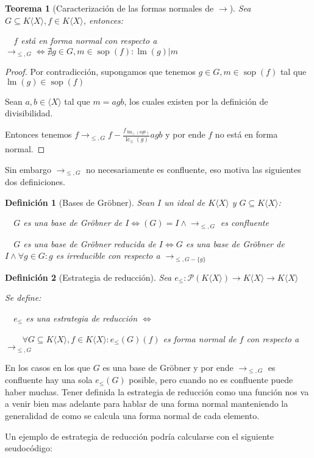 \documentclass{amsbook}
\theoremstyle{customstyle}
\newtheorem{definition}{Definición}[section]
\newtheorem{theorem}{Teorema}[section]
\DeclareMathOperator{\sop}{sop}
\DeclareMathOperator{\lm}{lm}
\DeclareMathOperator{\lc}{lc}
\begin{document}
\begin{theorem}[Caracterización de las formas normales de $→$]
Sea $G ⊆ K⟨X⟩, f ∈ K⟨X⟩$, entonces:

  $f$ está en forma normal con respecto a $→_{≤, G} ⇔ ∄g ∈ G, m ∈ \sop(f) : \lm(g) | m$

\end{theorem}
\begin{proof}
Por contradicción, supongamos que tenemos $g ∈ G, m ∈ \sop(f)$ tal que $\lm(g) ∈ \sop(f)$

Sean $a, b ∈ ⟨X⟩$ tal que $m = agb$, los cuales existen por la definición de divisibilidad.

Entonces tenemos $f →_{≤, G} f - \frac{f_{\lm_≤(agb)}}{\lc_≤(g)}agb$ y por ende $f$ no está en forma normal.

\end{proof}

Sin embargo $→_{≤, G}$ no necesariamente es confluente, eso motiva las siguientes dos definiciones.

\begin{definition}[Bases de Gröbner]
Sean $I$ un ideal de $K⟨X⟩$ y $G ⊆ K⟨X⟩$:

  $G$ es una base de Gröbner de $I ⇔ (G) = I ∧ →_{≤, G}$ es confluente

  $G$ es una base de Gröbner reducida de $I ⇔ G$ es una base de Gröbner de $I ∧ ∀g ∈ G : g$ es irreducible con respecto a $→_{≤, G - \{g\}}$

\end{definition}

\begin{definition}[Estrategia de reducción]
Sea $e_≤ : 𝒫(K⟨X⟩) → K⟨X⟩ → K⟨X⟩$

Se define:

  $e_≤$ es una estrategia de reducción $⇔$

    $∀G ⊆ K⟨X⟩, f ∈ K⟨X⟩ : e_≤(G)(f)$ es forma normal de $f$ con respecto a $→_{≤, G}$
\end{definition}

En los casos en los que $G$ es una base de Gröbner y por ende $→_{≤, G}$ es confluente hay una sola $e_≤(G)$ posible, pero cuando no es confluente puede haber muchas. Tener definida la estrategia de reducción como una función nos va a venir bien mas adelante para hablar de una forma normal manteniendo la generalidad de como se calcula una forma normal de cada elemento.

Un ejemplo de estrategia de reducción podría calcularse con el siguiente seudocódigo:
\end{document}
